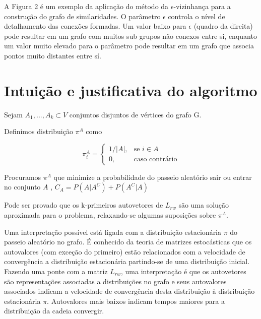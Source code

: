 \documentclass[]{article}
\begin{document}
A Figura 2 é um exemplo da aplicação do método da $\epsilon$-vizinhança para a construção do grafo de similaridades. O parâmetro $\epsilon$ controla o nível de detalhamento das conexões formadas. Um valor baixo para $\epsilon$ (quadro da direita) pode resultar em um grafo com muitos sub grupos não conexos entre si, enquanto um valor muito elevado para o parâmetro pode resultar em um grafo que associa pontos muito distantes entre sí.

\vspace{0.3cm}

\section{Intuição e justificativa do algoritmo}







Sejam $A_1, ..., A_k \subset V$ conjuntos disjuntos de vértices do grafo G. 

\vspace{0.3cm}

Definimos distribuição $\pi^{A}$ como 

$$\pi^{A}_i = \begin{cases} 1/|A|, & \text{se } i \in A \\ 0, & \text{caso contrário}\end{cases}$$

\vspace{0.5cm}

Procuramos $\pi^A$ que minimize a probabilidade do passeio aleatório sair ou entrar no conjunto $A$ , $C_A = P(A|A^C) + P(A^C|A)$

\vspace{0.5cm}

Pode ser provado que os k-primeiros autovetores de $L_{rw}$ são uma solução aproximada para o problema, relaxando-se algumas suposições sobre $\pi^A$.

Uma interpretação possível está ligada com a distribuição estacionária $\pi$ do passeio aleatório no grafo. É conhecido da teoria de matrizes estocásticas que os autovalores (com exceção do primeiro) estão relacionados com a velocidade de convergência a distribuição estacionária partindo-se de uma distribuição inicial. Fazendo uma ponte com a matriz $L_{rw}$, uma interpretação é que os autovetores são representações associadas a distribuições no grafo e seus autovalores associados indicam a velocidade de convergência desta distribuição à distribuição estacionária $\pi$. Autovalores mais baixos indicam tempos maiores para a distribuição da cadeia convergir.
\end{document}
